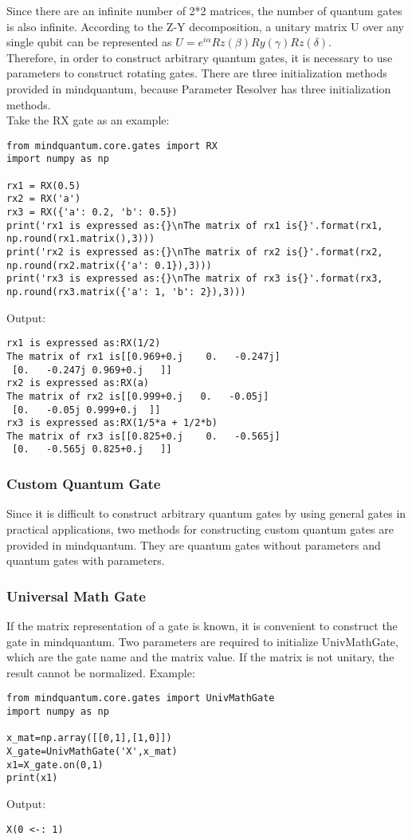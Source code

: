 Since there are an infinite number of 2*2 matrices, the number of quantum gates is also infinite. According to the Z-Y decomposition, a unitary matrix U over any single qubit can be represented as $U=e^{i\alpha}Rz(\beta)Ry(\gamma)Rz(\delta)$.\\
Therefore, in order to construct arbitrary quantum gates, it is necessary to use parameters to construct rotating gates. There are three initialization methods provided in mindquantum, because Parameter Resolver has three initialization methods. \\
Take the RX gate as an example:
\begin{lstlisting}
from mindquantum.core.gates import RX
import numpy as np

rx1 = RX(0.5)
rx2 = RX('a')
rx3 = RX({'a': 0.2, 'b': 0.5})
print('rx1 is expressed as:{}\nThe matrix of rx1 is{}'.format(rx1, np.round(rx1.matrix(),3)))
print('rx2 is expressed as:{}\nThe matrix of rx2 is{}'.format(rx2, np.round(rx2.matrix({'a': 0.1}),3)))
print('rx3 is expressed as:{}\nThe matrix of rx3 is{}'.format(rx3, np.round(rx3.matrix({'a': 1, 'b': 2}),3)))
\end{lstlisting}
Output:
\begin{lstlisting}
rx1 is expressed as:RX(1/2)
The matrix of rx1 is[[0.969+0.j    0.   -0.247j]
 [0.   -0.247j 0.969+0.j   ]]
rx2 is expressed as:RX(a)
The matrix of rx2 is[[0.999+0.j   0.   -0.05j]
 [0.   -0.05j 0.999+0.j  ]]
rx3 is expressed as:RX(1/5*a + 1/2*b)
The matrix of rx3 is[[0.825+0.j    0.   -0.565j]
 [0.   -0.565j 0.825+0.j   ]]
\end{lstlisting}

\subsubsection{Custom Quantum Gate}
Since it is difficult to construct arbitrary quantum gates by using general gates in practical applications, two methods for constructing custom quantum gates are provided in mindquantum. They are quantum gates without parameters and quantum gates with parameters.
\subsubsection{Universal Math Gate}
If the matrix representation of a gate is known, it is convenient to construct the gate in mindquantum. Two parameters are required to initialize UnivMathGate, which are the gate name and the matrix value. If the matrix is not unitary, the result cannot be normalized.
Example:
\begin{lstlisting}
from mindquantum.core.gates import UnivMathGate
import numpy as np

x_mat=np.array([[0,1],[1,0]])
X_gate=UnivMathGate('X',x_mat)
x1=X_gate.on(0,1)
print(x1)
\end{lstlisting}
Output:
\begin{lstlisting}
X(0 <-: 1)
\end{lstlisting}

